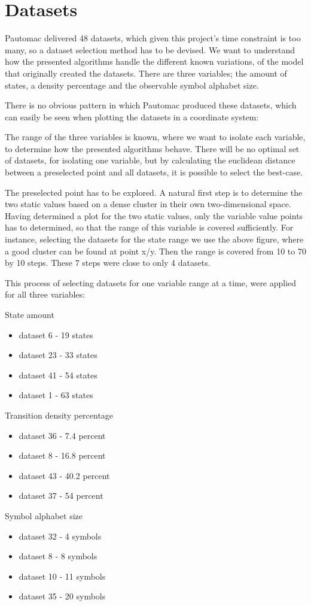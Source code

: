 \section{Datasets}
Pautomac delivered 48 datasets, which given this project's time constraint is too many, so a dataset selection method has to be devised. We want to understand how the presented algorithms handle the different known variations, of the model that originally created the datasets. There are three variables; the amount of states, a density percentage and the observable symbol alphabet size.

There is no obvious pattern in which Pautomac produced these datasets, which can easily be seen when plotting the datasets in a coordinate system:




The range of the three variables is known, where we want to isolate each variable, to determine how the presented algorithms behave. There will be no optimal set of datasets, for isolating one variable, but by calculating the euclidean distance between a preselected point and all datasets, it is possible to select the best-case.

The preselected point has to be explored. A natural first step is to determine the two static values based on a dense cluster in their own two-dimensional space. Having determined a plot for the two static values, only the variable value points has to determined, so that the range of this variable is covered sufficiently. For instance, selecting the datasets for the state range we use the above figure, where a good cluster can be found at point x/y. Then the range is covered from 10 to 70 by 10 steps. These 7 steps were close to only 4 datasets.  

This process of selecting datasets for one variable range at a time, were applied for all three variables:

State amount 
\begin{itemize}
\item dataset 6 - 19 states
\item dataset 23 - 33 states
\item dataset 41 - 54 states
\item dataset 1 - 63 states
\end{itemize}

Transition density percentage
\begin{itemize}
\item dataset 36 - 7.4 percent 
\item dataset 8 - 16.8 percent
\item dataset 43 - 40.2 percent
\item dataset 37 - 54 percent
\end{itemize}

Symbol alphabet size
\begin{itemize}
\item dataset 32 - 4 symbols
\item dataset 8 - 8 symbols
\item dataset 10 - 11 symbols
\item dataset 35 - 20 symbols
\end{itemize}
